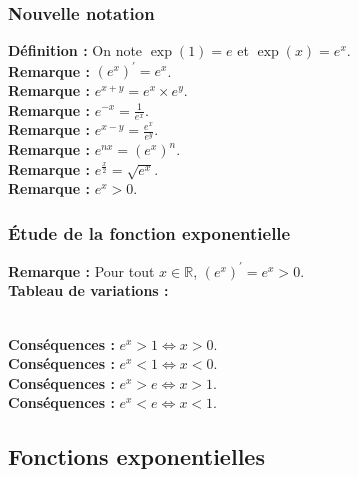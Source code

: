 \documentclass[a4paper,titlepage]{article}
\makeatletter
\def\tikzscale{1}\begin{lrbox}{\measure@tikzpicture}
\edef\tikzscale{\pgfmathresult}
\makeatother
\begin{document}
        \subsubsection{Nouvelle notation}
            \textbf{Définition :} On note $\exp\left(1\right)=e$ et $\exp\left(x\right)=e^{x}$.
            \\
            \textbf{Remarque :} $\left(e^{x}\right)^{\prime}=e^{x}$.
            \\
            \textbf{Remarque :} $e^{x+y}=e^{x}\times e^{y}$.
            \\
            \textbf{Remarque :} $e^{-x}=\frac{1}{e^{x}}$.
            \\
            \textbf{Remarque :} $e^{x-y}=\frac{e^{x}}{e^{y}}$.
            \\
            \textbf{Remarque :} $e^{nx}=\left(e^{x}\right)^{n}$.
            \\
            \textbf{Remarque :} $e^{\frac{x}{2}}=\sqrt{e^{x}}$.
            \\
            \textbf{Remarque :} $e^{x}>0$.
    \subsubsection{Étude de la fonction exponentielle}
        \textbf{Remarque :} Pour tout $x\in\mathbb{R}$, $\left(e^{x}\right)^{\prime}=e^{x}>0$.
        \\
        \textbf{Tableau de variations :}
        \\
        \begin{scaletikzpicturetowidth}{\textwidth}
        \end{scaletikzpicturetowidth}
        \\
        \textbf{Conséquences :} $e^{x}>1\Leftrightarrow x>0$.
        \\
        \textbf{Conséquences :} $e^{x}<1\Leftrightarrow x<0$.
        \\
        \textbf{Conséquences :} $e^{x}>e\Leftrightarrow x>1$.
        \\
        \textbf{Conséquences :} $e^{x}<e\Leftrightarrow x<1$.
    \subsection{Fonctions exponentielles}
\end{document}
